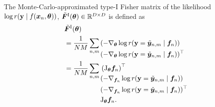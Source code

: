 \begin{definition}\label{def:mc_fisher}%
  The Monte-Carlo-approximated type-I Fisher matrix of the likelihood $\log r({\mathbf{y}} \mid f({\bm{x}}_n, {\bm{\theta}}))$,
  $\tilde{{\bm{F}}}^{\text{I}}({\bm{\theta}}) \in {\mathbb{R}}^{D \times D}$ is defined as
  \begin{align*}
    & \tilde{{\bm{F}}}^{\text{I}}({\bm{\theta}}) \\
	& = \frac{1}{NM} \sum_{n,m}
	\begin{aligned}[t]
	   & (-\nabla_{{\bm{\theta}}} \log r({\mathbf{y}} = \tilde{{\bm{y}}}_{n,m} \mid {\bm{f}}_n))        \\
	   & (-\nabla_{{\bm{\theta}}} \log r({\mathbf{y}} = \tilde{{\bm{y}}}_{n,m} \mid {\bm{f}}_n))^{\top} \\
	\end{aligned} \\
    & = \frac{1}{NM} \sum_{n,m}
    \begin{aligned}[t]
       & \left(\mathrm{J}_{{\bm{\theta}}}{\bm{f}}_n\right)^{\top}                              \\
       & (-\nabla_{{\bm{f}}_n} \log r({\mathbf{y}} = \tilde{{\bm{y}}}_{n,m} \mid {\bm{f}}_n))        \\
       & (-\nabla_{{\bm{f}}_n} \log r({\mathbf{y}} = \tilde{{\bm{y}}}_{n,m} \mid {\bm{f}}_n))^{\top} \\
       & \mathrm{J}_{{\bm{\theta}}}{\bm{f}}_n.
    \end{aligned}
  \end{align*}
\end{definition}

